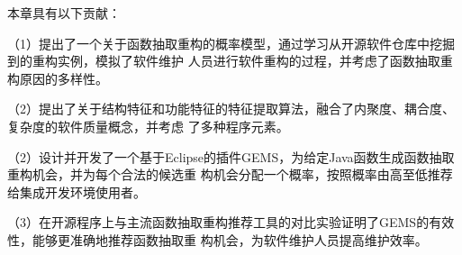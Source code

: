 本章具有以下贡献：

（1）提出了一个关于函数抽取重构的概率模型，通过学习从开源软件仓库中挖掘到的重构实例，模拟了软件维护
人员进行软件重构的过程，并考虑了函数抽取重构原因的多样性。

（2）提出了关于结构特征和功能特征的特征提取算法，融合了内聚度、耦合度、复杂度的软件质量概念，并考虑
了多种程序元素。

（2）设计并开发了一个基于Eclipse的插件GEMS，为给定Java函数生成函数抽取重构机会，并为每个合法的候选重
构机会分配一个概率，按照概率由高至低推荐给集成开发环境使用者。

（3）在开源程序上与主流函数抽取重构推荐工具的对比实验证明了GEMS的有效性，能够更准确地推荐函数抽取重
构机会，为软件维护人员提高维护效率。